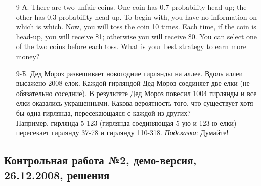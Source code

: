 \begin{enumerate}
\item[9-А.] There are two unfair coins. One coin has 0.7 probability head-up; the other has 0.3 probability head-up. To begin with, you have no information on which is which. Now, you will toss the coin 10 times. Each time, if the coin is head-up, you will receive \$1; otherwise you will receive \$0. You can select one of the two coins before each toss. What is your best strategy to earn more money?
\item[9-Б.] Дед Мороз развешивает новогодние гирлянды на аллее. Вдоль аллеи высажено 2008 елок. Каждой гирляндой Дед Мороз соединяет две елки (не обязательно соседние). В результате Дед Мороз повесил 1004 гирлянды и все елки оказались украшенными. Какова вероятность того, что существует хотя бы одна гирлянда, пересекающаяся с каждой из других? \\
Например, гирлянда 5-123 (гирлянда соединяющая 5-ую и 123-ю елки) пересекает гирлянду 37-78 и гирлянду 110-318.
\emph{Подсказка}: Думайте!
\end{enumerate}


\subsection{Контрольная работа №2, демо-версия, 26.12.2008, решения}

